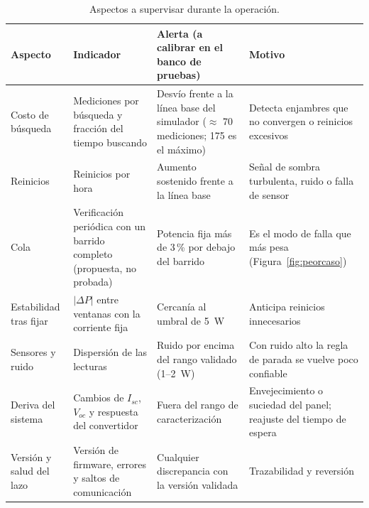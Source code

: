 \documentclass[letterpaper,11pt]{article}
\begin{document}
\begin{table}[H]
  \centering
  \caption{Aspectos a supervisar durante la operación.}
  \label{tab:monitoreo}
  \footnotesize
  \begin{tabularx}{\linewidth}{@{}p{2.4cm}p{3.9cm}p{4.0cm}L@{}}
    \toprule
    \textbf{Aspecto} & \textbf{Indicador} & \textbf{Alerta (a calibrar en el banco de pruebas)} & \textbf{Motivo} \\
    \midrule
    Costo de búsqueda & Mediciones por búsqueda y fracción del tiempo buscando & Desvío frente a la línea base del simulador ($\approx$ 70 mediciones; 175 es el máximo) & Detecta enjambres que no convergen o reinicios excesivos \\
    Reinicios & Reinicios por hora & Aumento sostenido frente a la línea base & Señal de sombra turbulenta, ruido o falla de sensor \\
    Cola & Verificación periódica con un barrido completo (propuesta, no probada) & Potencia fija más de 3\,\% por debajo del barrido & Es el modo de falla que más pesa (Figura~\ref{fig:peorcaso}) \\
    Estabilidad tras fijar & $|\Delta P|$ entre ventanas con la corriente fija & Cercanía al umbral de 5~W & Anticipa reinicios innecesarios \\
    Sensores y ruido & Dispersión de las lecturas & Ruido por encima del rango validado (1--2~W) & Con ruido alto la regla de parada se vuelve poco confiable \\
    Deriva del sistema & Cambios de $I_{sc}$, $V_{oc}$ y respuesta del convertidor & Fuera del rango de caracterización & Envejecimiento o suciedad del panel; reajuste del tiempo de espera \\
    Versión y salud del lazo & Versión de firmware, errores y saltos de comunicación & Cualquier discrepancia con la versión validada & Trazabilidad y reversión \\
    \bottomrule
  \end{tabularx}
\end{table}
\end{document}
